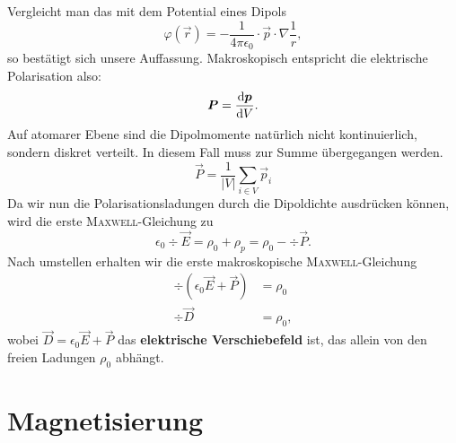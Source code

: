 Vergleicht man das mit dem Potential eines Dipols
\begin{equation*}
\varphi(\vec{r})=-\frac{1}{4\pi\epsilon_0}\cdot\vec{p}\cdot\nabla\frac{1}{r},
\end{equation*}
so bestätigt sich unsere Auffassung. Makroskopisch entspricht die elektrische Polarisation also:
\begin{equation*}
\bm{P} = \frac{\mathrm{d}{\bm{p}}}{\mathrm{d}{V}}.
\end{equation*}
Auf atomarer Ebene sind die Dipolmomente natürlich nicht kontinuierlich, sondern diskret verteilt. In diesem Fall muss zur Summe übergegangen werden.
\begin{equation*}
\vec{P} = \frac{1}{|V|}\sum\limits_{i\in V}\vec{p}_i
\end{equation*}
Da wir nun die Polarisationsladungen durch die Dipoldichte ausdrücken können, wird die erste \textsc{Maxwell}-Gleichung zu
\begin{equation*}
\epsilon_0\div\vec{E}=\rho_0+\rho_p = \rho_0 - \div\vec{P}.
\end{equation*}
Nach umstellen erhalten wir die erste makroskopische \textsc{Maxwell}-Gleichung
\begin{align*}
\div\left(\epsilon_0\vec{E}+\vec{P}\right)&=\rho_0\\
\div\vec{D} &= \rho_0 ,
\end{align*}
wobei $\vec{D} = \epsilon_0\vec{E} +\vec{P}$ das \textbf{elektrische Verschiebefeld} ist, das allein von den freien Ladungen $\rho_0$ abhängt.

\section{Magnetisierung}

